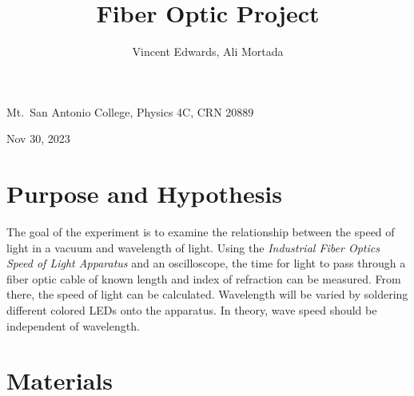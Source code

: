 \documentclass[12pt]{iopart} %
\begin{document}
\title{Fiber Optic Project}
\author{Vincent Edwards, Ali Mortada}
\vspace{10pt}
\begin{indented}
  \item[]Mt.~San Antonio College, Physics 4C, CRN 20889
  \item[]Nov 30, 2023
\end{indented}
\newpage

\section{Purpose and Hypothesis}

The goal of the experiment is to examine the relationship between the
speed of light in a vacuum and wavelength of light.
Using the \emph{Industrial Fiber Optics Speed of Light Apparatus} and an
oscilloscope, the time for light to pass through a fiber optic cable of
known length and index of refraction can be measured.
From there, the speed of light can be calculated.
Wavelength will be varied by soldering different colored LEDs onto the apparatus.
In theory, wave speed should be independent of wavelength.

\section{Materials}
\end{document}
